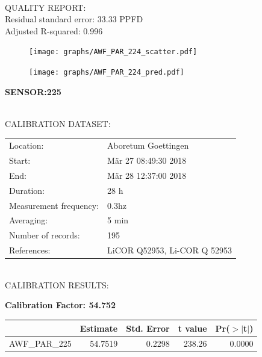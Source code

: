 \documentclass[oneside]{report}
\begin{document}
\hrulefill\\
QUALITY REPORT:\\
Residual standard error: 33.33 PPFD\\
Adjusted R-squared: 0.996



\begin{figure}[H]
  \centering
  \texttt{[image: graphs/AWF\_PAR\_224\_scatter.pdf]}
\end{figure}




\begin{figure}[H]
  \centering
  \texttt{[image: graphs/AWF\_PAR\_224\_pred.pdf]}
\end{figure}

\pagebreak


\begin{center}
\large{\textbf{SENSOR:225}}\\
\end{center}

\hrulefill\\
CALIBRATION DATASET:\\
\begin{table}[h!]
  \centering
  \label{tab:table1}
  \begin{tabular}{ll}
    Location: & Aboretum Goettingen\\ 
    
    
    Start:  & Mär 27 08:49:30 2018 \\
    End:   & Mär 28 12:37:00 2018\\ 
    Duration: & 28 h\\
    Measurement frequency: & 0.3hz\\
    Averaging:  &5 min\\
    Number of records: & 195 \\
    References: & LiCOR Q52953, Li-COR Q 52953 \\
  \end{tabular}
\end{table}

\hrulefill\\
CALIBRATION RESULTS:\\


\begin{center}
\textbf{\large{Calibration Factor: 54.752}}\\
\end{center}
\begin{table}[ht]
\centering
\begin{tabular}{rrrrr}
  \hline
 & Estimate & Std. Error & t value & Pr($>$$|$t$|$) \\ 
  \hline
AWF\_PAR\_225 & 54.7519 & 0.2298 & 238.26 & 0.0000 \\ 
   \hline
\end{tabular}
\end{table}
\end{document}
